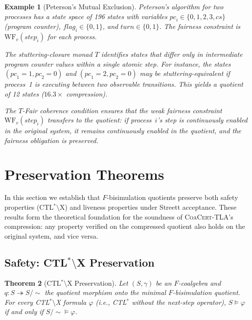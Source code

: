 \documentclass[11pt]{article}
\newtheorem{theorem}{Theorem}
\newtheorem{example}[theorem]{Example}
\newcommand{\WF}{\ensuremath{\mathrm{WF}}}
\newcommand{\TFair}{$T$-Fair}
\newcommand{\CoaCert}{\textsc{CoaCert-TLA}}
\begin{document}
\begin{example}[Peterson's Mutual Exclusion]
\label{ex:peterson}
Peterson's algorithm for two processes has a state space of 196 states
with variables $\mathit{pc}_i \in \{0, 1, 2, 3, \mathit{cs}\}$ (program
counter), $\mathit{flag}_i \in \{0, 1\}$, and $\mathit{turn} \in \{0, 1\}$.
The fairness constraint is $\WF_v(\mathit{step}_i)$ for each process.

The stuttering-closure monad $T$ identifies states that differ only in
intermediate program counter values within a single atomic step.
For instance, the states $(\mathit{pc}_1 = 1, \mathit{pc}_2 = 0)$ and
$(\mathit{pc}_1 = 2, \mathit{pc}_2 = 0)$ may be stuttering-equivalent
if process~1 is executing between two observable transitions.
This yields a quotient of 12 states ($16.3\times$ compression).

The \TFair{} coherence condition ensures that the weak fairness constraint
$\WF_v(\mathit{step}_i)$ transfers to the quotient: if process~$i$'s
step is continuously enabled in the original system, it remains
continuously enabled in the quotient, and the fairness obligation is
preserved.
\end{example}

\section{Preservation Theorems}
\label{sec:preservation}

In this section we establish that $F$-bisimulation quotients preserve
both safety properties (CTL$^*$$\setminus$X) and liveness properties
under Streett acceptance.
These results form the theoretical foundation for the soundness of
\CoaCert{}'s compression: any property verified on the compressed
quotient also holds on the original system, and vice versa.

\subsection{Safety: CTL$^*$$\setminus$X Preservation}

\begin{theorem}[CTL$^*$$\setminus$X Preservation]
\label{thm:safety}
Let $(S, \gamma)$ be an $F$-coalgebra and $q : S \twoheadrightarrow S/{\sim}$
the quotient morphism onto the minimal $F$-bisimulation quotient.
For every CTL$^*$$\setminus$X formula $\varphi$ (i.e., CTL$^*$ without the
next-step operator), $S \models \varphi$ if and only if
$S/{\sim} \models \varphi$.
\end{theorem}
\end{document}
